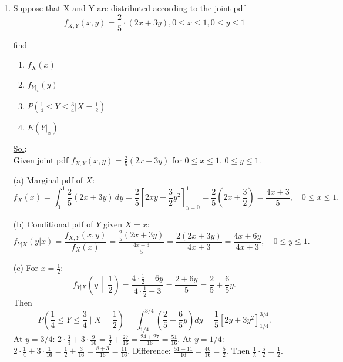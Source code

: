 \begin{enumerate}
	      (d) \(\mathbb{E}[Y\mid X=x]=\int_x^\infty y\,e^{-(y-x)}dy\). Substitute \(u=y-x\):
	      \(=\int_0^\infty (x+u)e^{-u}du=x\int_0^\infty e^{-u}du+\int_0^\infty u e^{-u}du=x\cdot1+1=x+1\).

	      \[
		      \boxed{\text{(a) }\frac{e-1}{e+1}\quad\text{(b) }0\quad\text{(c) }e^{-(y-x)},\,y\ge x\quad\text{(d) }x+1}
	      \]

	\item[16.] Suppose that X and Y are distributed according to the joint pdf
	      \[
		      f_{X, Y}(x, y) = \frac{2}{5} \cdot (2x + 3y), 0 \leq x \leq 1, 0 \leq y \leq 1
	      \]

	      find
	      \begin{enumerate}
		      \item \(f_X (x)\)
		      \item \(f_{Y|_x} (y)\)
		      \item \(P(\frac{1}{4} \leq Y \leq \frac{3}{4} | X = \frac{1}{2})\)
		      \item \(E(Y |_x)\)
	      \end{enumerate}

	      \underline{Sol}: \\

	      Given joint pdf \(f_{X,Y}(x,y) = \frac{2}{5}(2x+3y)\) for \(0 \le x \le 1\), \(0 \le y \le 1\).

	      (a) Marginal pdf of \(X\):
	      \[
		      f_X(x) = \int_0^1 \frac{2}{5}(2x+3y)\,dy = \frac{2}{5}\left[2xy + \frac{3}{2}y^2\right]_{y=0}^{1} = \frac{2}{5}\left(2x + \frac{3}{2}\right) = \frac{4x+3}{5},\quad 0\le x\le1.
	      \]

	      (b) Conditional pdf of \(Y\) given \(X=x\):
	      \[
		      f_{Y|X}(y|x) = \frac{f_{X,Y}(x,y)}{f_X(x)} = \frac{\frac{2}{5}(2x+3y)}{\frac{4x+3}{5}} = \frac{2(2x+3y)}{4x+3} = \frac{4x+6y}{4x+3},\quad 0\le y\le1.
	      \]

	      (c) For \(x=\frac12\):
	      \[
		      f_{Y|X}\!\left(y\,\middle|\,\frac12\right) = \frac{4\cdot\frac12+6y}{4\cdot\frac12+3} = \frac{2+6y}{5} = \frac{2}{5} + \frac{6}{5}y.
	      \]
	      Then
	      \[
		      P\!\left(\frac14 \le Y \le \frac34 \mid X=\frac12\right) = \int_{1/4}^{3/4} \left(\frac{2}{5}+\frac{6}{5}y\right)dy = \frac{1}{5}\left[2y+3y^2\right]_{1/4}^{3/4}.
	      \]
	      At \(y=3/4\): \(2\cdot\frac34+3\cdot\frac{9}{16} = \frac32+\frac{27}{16} = \frac{24+27}{16}=\frac{51}{16}\).
	      At \(y=1/4\): \(2\cdot\frac14+3\cdot\frac{1}{16} = \frac12+\frac{3}{16} = \frac{8+3}{16}=\frac{11}{16}\).
	      Difference: \(\frac{51-11}{16}=\frac{40}{16}=\frac52\). Then \(\frac15\cdot\frac52 = \frac12\).


\end{enumerate}
